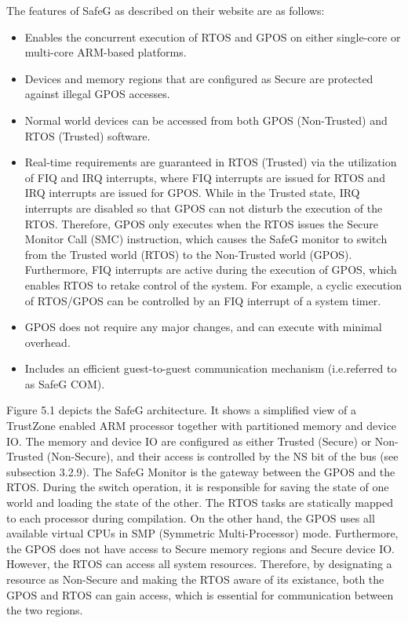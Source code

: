 The features of SafeG as described on their website are as follows:

\begin{itemize}
\item Enables the concurrent execution of RTOS and GPOS on either single-core or multi-core ARM-based platforms.

\item Devices and memory regions that are configured as Secure are protected against illegal GPOS accesses.

\item Normal world devices can be accessed from both GPOS (Non-Trusted) and RTOS (Trusted) software.

\item Real-time requirements are guaranteed in RTOS (Trusted) via the utilization of FIQ and IRQ interrupts, where FIQ interrupts are issued for RTOS and IRQ interrupts are issued for GPOS. While in the Trusted state, IRQ interrupts are disabled so that GPOS can not disturb the execution of the RTOS. Therefore, GPOS only executes when the RTOS issues the Secure Monitor Call (SMC) instruction, which causes the SafeG monitor to switch from the Trusted world (RTOS) to the Non-Trusted world (GPOS). Furthermore, FIQ interrupts are active during the execution of GPOS, which enables RTOS to retake control of the system. For example, a cyclic execution of RTOS/GPOS can be controlled by an FIQ interrupt of a system timer.

\item GPOS does not require any major changes, and can execute with minimal overhead.

\item Includes an efficient guest-to-guest communication mechanism (i.e.referred to as SafeG COM).
\end{itemize}

Figure 5.1 depicts the SafeG architecture. It shows a simplified view of a TrustZone enabled ARM processor together with partitioned memory and device IO. The memory and device IO are configured as either Trusted (Secure) or Non-Trusted (Non-Secure), and their access is controlled by the NS bit of the bus (see subsection 3.2.9). The SafeG Monitor is the gateway between the GPOS and the RTOS. During the switch operation, it is responsible for saving the state of one world and loading the state of the other. The RTOS tasks are statically mapped to each processor during compilation. On the other hand, the GPOS uses all available virtual CPUs in SMP (Symmetric Multi-Processor) mode. Furthermore, the GPOS does not have access to Secure memory regions and Secure device IO. However, the RTOS can access all system resources. Therefore, by designating a resource as Non-Secure and making the RTOS aware of its existance, both the GPOS and RTOS can gain access, which is essential for communication between the two regions.

